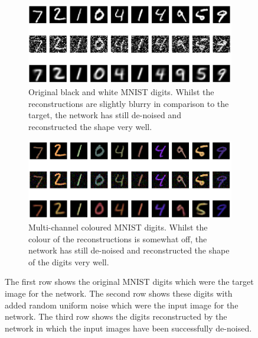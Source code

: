 \documentclass[fleqn,usenatbib]{mnras}
\begin{document}
\begin{figure}
\begin{subfigure}[b]{\columnwidth}
	\includegraphics[width=\columnwidth]{Figures/mnist_blackwhite.png}
    \caption{Original black and white MNIST digits. Whilst the reconstructions are slightly blurry in comparison to the target, the network has still de-noised and reconstructed the shape very well.}
    \label{fig:MNIST}
    \end{subfigure}
    
 \begin{subfigure}[b]{\columnwidth}
	\includegraphics[width=\columnwidth]{Figures/mnist_colour.png}
    \caption{Multi-channel coloured MNIST digits. Whilst the colour of the reconstructions is somewhat off, the network has still de-noised and reconstructed the shape of the digits very well.}
    \label{fig:colour_MNIST}
    \end{subfigure}
    
        \caption{The first row shows the original MNIST digits which were the target image for the network. The second row shows these digits with added random uniform noise which were the input image for the network. The third row shows the digits reconstructed by the network in which the input images have been successfully de-noised.}
    \label{MNISTPlots}
\end{figure}
\end{document}
